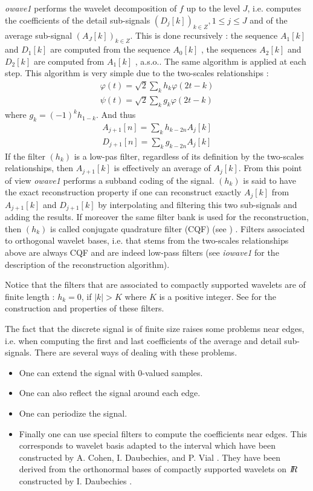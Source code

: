 {\em owave1} performs the wavelet decomposition of \( f \) up to the level \( J \), i.e. computes the coefficients of the detail sub-signals \( (D_{j}[k])_{k \in Z}, 1 \leq j \leq J \) and of the average sub-signal \( (A_{J}[k])_{k \in Z} \). This is done recursively : the sequence \( A_{1}[k] \) and \( D_{1}[k] \) are computed from the sequence \( A_{0}[k] \) , the sequences \( A_{2}[k] \)  and \( D_{2}[k] \) are computed from \( A_{1}[k] \) , a.s.o.. The same algorithm is applied at each step. This algorithm is very simple due to the two-scales relationships : 
\begin{eqnarray*}
\varphi(t) = \sqrt{2} \sum_{k} h_{k} \varphi(2t-k) \\
\psi(t) = \sqrt{2} \sum_{k} g_{k} \varphi(2t-k)
\end{eqnarray*}
where \( g_{k} = (-1)^{k} h_{1-k} \).
And thus
\begin{eqnarray*}
A_{j+1}[n] = \sum_{k} h_{k-2n} A_{j}[k] \\
D_{j+1}[n] = \sum_{k} g_{k-2n} A_{j}[k] 
\end{eqnarray*}
If the filter \( (h_{k}) \) is a low-pas filter, regardless of its definition by the two-scales relationships, then \( A_{j+1}[k] \) is effectively an average of \( A_{j}[k] \). From this point of view {\em owave1} performs a subband coding of the signal. 
\( (h_{k}) \) is said to have the exact reconstruction property if one can reconstruct exactly \( A_{j}[k] \) from \( A_{j+1}[k] \) and \( D_{j+1}[k] \) by interpolating and filtering this two sub-signals and adding the results. 
If moreover the same filter bank is used for the reconstruction, then  $(h_{k})$ is called conjugate quadrature filter (CQF) (see \cite{kn:sb}) . Filters associated to orthogonal wavelet bases, i.e. that stems from the two-scales relationships above are always CQF and are indeed low-pass filters (see {\em iowave1 } for the description of the reconstruction algorithm).

Notice that the filters that are associated to compactly supported wavelets are of finite length : \( h_{k} = 0 \), if \( |k| > K \) where \( K \) is a positive integer. See \cite{kn:dau1} for the construction and properties of these filters. 

The fact that the discrete signal is of finite size raises some problems near edges, i.e. when computing the first and last coefficients of the average and detail sub-signals. There are several ways of dealing with these problems. 
\begin{itemize}
\item
One can extend the signal with \( 0 \)-valued samples.
\item
One can also reflect the signal around each edge.
\item
One can periodize the signal.
\item
Finally one can use special filters to compute the coefficients near edges. This corresponds to wavelet basis adapted to the interval which have been constructed by A. Cohen, I. Daubechies, and P. Vial \cite{kn:cdv}. They have been derived from the orthonormal bases of compactly supported wavelets on \( I\!\!R \) constructed by I. Daubechies \cite{kn:dau1}. 
\end{itemize}

